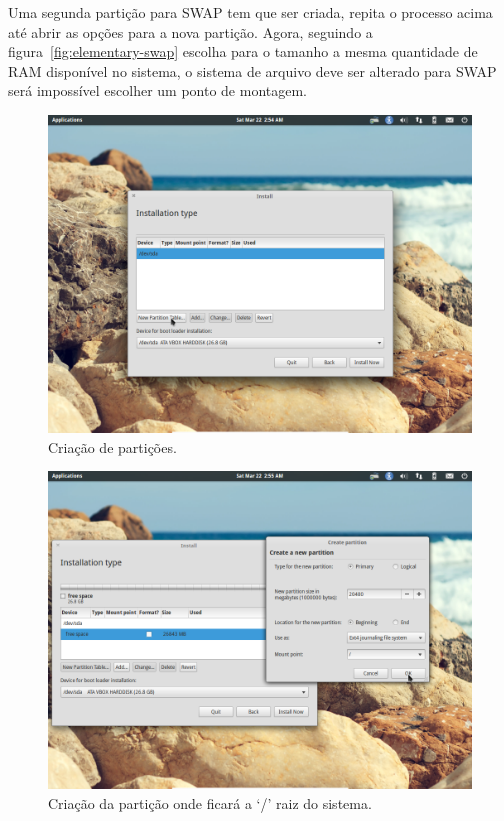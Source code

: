 \documentclass{handout_utfpr}
\begin{document}
Uma segunda partição para SWAP tem que ser criada, repita o processo acima até abrir as opções para a nova partição. Agora, seguindo a figura~\ref{fig:elementary-swap} escolha para o tamanho a mesma quantidade de RAM disponível no sistema, o sistema de arquivo deve ser alterado para SWAP será impossível escolher um ponto de montagem.

\begin{figure}[H]
  \centering
  \includegraphics[scale=.3]{imagens/elementary-install-04.png}
  \caption{Criação de partições.}
  \label{fig:elementary-partition}
\end{figure}

\begin{figure}[H]
  \centering
  \includegraphics[scale=.3]{imagens/elementary-install-05.png}
  \caption{Criação da partição onde ficará a `/' raiz do sistema.}
  \label{fig:elementary-root}
\end{figure}
\end{document}
